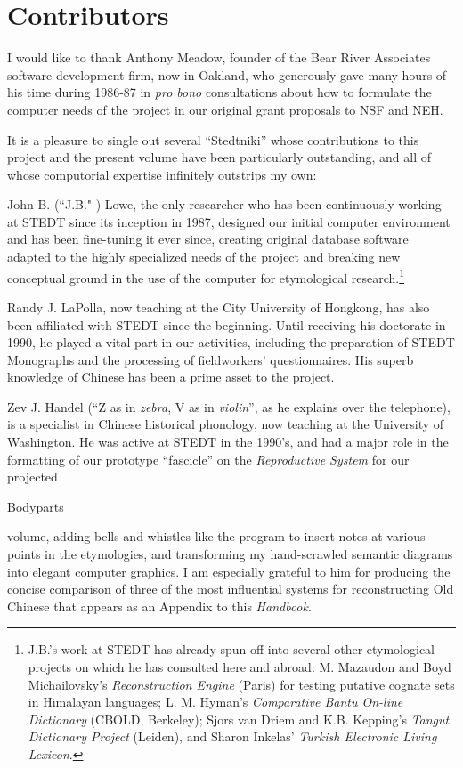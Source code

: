 \section{Contributors}

I would like to thank Anthony Meadow, founder of the Bear River Associates software development firm, now in Oakland, who generously gave many hours of his time during 1986-87 in {\it pro bono} consultations about how to formulate the computer needs of the project in our original grant proposals to NSF and NEH. 

It is a pleasure to single out several ``Stedtniki''  whose contributions to this project and the present volume have been particularly outstanding, and all of whose computorial expertise infinitely outstrips my own:
\begin{itemize}
\item John B. (``J.B." ) Lowe, the only researcher who has been continuously working at STEDT since its inception in 1987, designed our initial computer environment and has been fine-tuning it ever since, creating original database software adapted to the highly specialized needs of the project and breaking new conceptual ground in the use of the computer for etymological research.\footnote{J.B.'s work at STEDT has already spun off into several other etymological projects on which he has consulted here and abroad: M. Mazaudon and Boyd Michailovsky's {\it Reconstruction Engine} (Paris) for testing putative cognate sets in Himalayan languages; L. M. Hyman's {\it Comparative Bantu On-line Dictionary} (CBOLD, Berkeley); Sjors van Driem and K.B. Kepping's {\it Tangut Dictionary Project} (Leiden), and Sharon Inkelas'  {\it Turkish Electronic Living Lexicon}.}
\item Randy J. LaPolla, now teaching at the City University of Hongkong, has also been affiliated with STEDT since the beginning. Until receiving his doctorate in 1990, he played a vital part in our activities, including the preparation of STEDT Monographs and the processing of fieldworkers' questionnaires. His superb knowledge of Chinese has been a prime asset to the project.
\item Zev J. Handel (``Z as in {\it zebra}, V as in {\it violin}'', as he explains over the telephone), is a specialist in Chinese historical phonology, now teaching at the University of Washington. He was active at STEDT in the 1990's, and had a major role in the formatting of our prototype ``fascicle''  on the {\it Reproductive System} for our projected {\item Bodyparts} volume, adding bells and whistles like the program to insert notes at various points in the etymologies, and transforming my hand-scrawled semantic diagrams into elegant computer graphics. I am especially grateful to him for producing the concise comparison of three of the most influential systems for reconstructing Old Chinese that appears as an Appendix to this {\it Handbook}.
\end{itemize}

